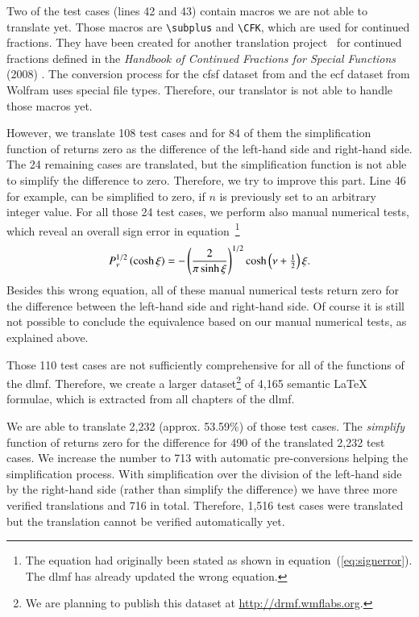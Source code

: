 Two of the test cases (lines 42 and 43) contain macros we are not able to translate yet. Those macros are \verb|\subplus| and \verb|\CFK|, which are used for continued fractions. They have been created for another translation project~\parencite[§5]{CICM:Paper} for continued fractions defined in the \textit{Handbook of Continued Fractions for Special Functions} (2008) \parencite{CF:Handbook}. The conversion process for the \gls{cfsf} \parencite{CF:Maple} dataset from \Maple{} and the \gls{ecf} \parencite{CF:eCF,eCF:FinalReport} dataset from Wolfram uses special file types. Therefore, our translator is not able to handle those macros yet.

However, we translate 108 test cases and for 84 of them the simplification function of \Maple{} returns zero as the difference of the left-hand side and right-hand side. The 24 remaining cases are translated, but the simplification function is not able to simplify the difference to zero. Therefore, we try to improve this part. Line 46~\parencite[(18.5.10)]{NIST:DLMF} for example, can be simplified to zero, if $n$ is previously set to an arbitrary integer value. For all those 24 test cases, we perform also manual numerical tests, which reveal an overall sign error in equation~\parencite[(14.5.14)]{NIST:DLMF}\footnote{The equation had originally been stated as shown in equation~(\ref{eq:signerror}). The \gls{dlmf} has already updated the wrong equation.}
\begin{equation}\label{eq:signerror}
\displaystyle P^{1/2}_{\nu}\left(\cosh{\xi}\right) = - \left( \frac{2}{{\pi} \sinh{\xi}} \right)^{1/2} \cosh{\left( \nu + \tfrac{1}{2} \right) \xi}.
\end{equation}
Besides this wrong equation, all of these manual numerical tests return zero for the difference between the left-hand side and right-hand side. Of course it is still not possible to conclude the equivalence based on our manual numerical tests, as explained above.

Those 110 test cases are not sufficiently comprehensive for all of the functions of the \gls{dlmf}. Therefore, we create a larger dataset\footnote{We are planning to publish this dataset at \url{http://drmf.wmflabs.org}.} of 4,165 semantic \LaTeX{} formulae, which is extracted from all chapters of the \gls{dlmf}. 

We are able to translate 2,232 (approx. 53.59\%) of those test cases. The \textit{simplify} function of \Maple{} returns zero for the difference for 490 of the translated 2,232 test cases. We increase the number to 713 with automatic pre-conversions helping the simplification process. With simplification over the division of the left-hand side by the right-hand side (rather than simplify the difference) we have three more verified translations and 716 in total. Therefore, 1,516 test cases were translated but the translation cannot be verified automatically yet.

